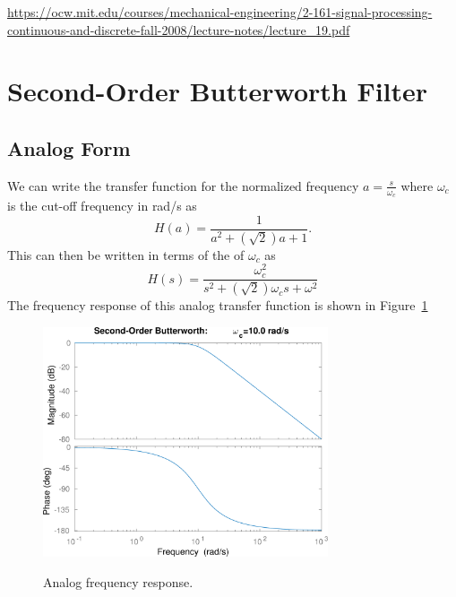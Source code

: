 \documentclass[12pt, letterpaper]{article}
\begin{document}
\url{https://ocw.mit.edu/courses/mechanical-engineering/2-161-signal-processing-continuous-and-discrete-fall-2008/lecture-notes/lecture_19.pdf}


\section{Second-Order Butterworth Filter}
\subsection{Analog Form}
We can write the transfer function for the normalized frequency $a=\frac{s}{\omega_c}$ where $\omega_c$ is the cut-off frequency in rad/s as
\[
H(a) = \frac{1}{a^2 + (\sqrt{2}) a + 1}.
\]
This can then be written in terms of the of $\omega_c$ as
\[
H(s) = \frac{\omega_c^2}{s^2 + (\sqrt{2})\omega_c s + \omega^2}
\]
The frequency response of this analog transfer function is shown in Figure~\ref{f:butter}
\begin{figure}[ht!]
\centering
{\includegraphics[width=0.75\textwidth]{butter_2.png}}
\caption{Analog frequency response.}
\label{f:butter}
\end{figure}
\end{document}
